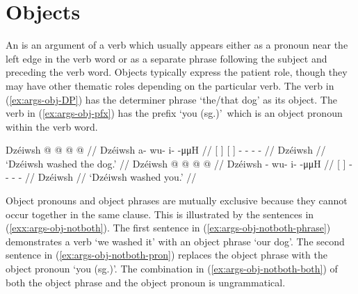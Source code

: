 \section{Objects}\label{sec:args-obj}

An  is an argument of a verb which usually appears either as a pronoun near the left edge in the verb word or as a separate phrase following the subject and preceding the verb word. Objects typically express the patient role, though they may have other thematic roles depending on the particular verb. The verb in (\ref{ex:args-obj-DP}) has the determiner phrase  ‘the/that dog’ as its object. The verb in (\ref{ex:args-obj-pfx}) has the prefix  ‘you (sg.)’\ which is an object pronoun within the verb word.

\pex\label{exx:args-obj}%
\a\label{ex:args-obj-DP}%
%
\begingl
	\gla	{} Dzéiwsh {} {}   {}  @ {} @ {} @ {} @ {} //
	\glb	{} Dzéiwsh {} {}   {} a- wu- i-  -μμH //
	\glc	{}[  {}] {}[   {}]
			- - -  - //
	\gld	{} Dzéiwsh {} {}   {}  {} {} {} {} //
	\glft	‘Dzéiwsh washed the dog.’
		//
\endgl
\a\label{ex:args-obj-pfx}%
%
\begingl
	\gla	{} Dzéiwsh {}  @ {} @ {} @ {} @ {} //
	\glb	{} Dzéiwsh {} - wu- i-  -μμH //
	\glc	{}[  {}] - - -  - //
	\gld	{} Dzéiwsh {}  {} {} {} {} //
	\glft	‘Dzéiwsh washed you.’
		//
\endgl
\xe

Object pronouns and object phrases are mutually exclusive because they cannot occur together in the same clause. This is illustrated by the sentences in (\ref{exx:args-obj-notboth}). The first sentence in (\ref{ex:args-obj-notboth-phrase}) demonstrates a verb  ‘we washed it’ with an object phrase  ‘our dog’. The second sentence in (\ref{ex:args-obj-notboth-pron}) replaces the object phrase with the object pronoun  ‘you (sg.)’. The combination in (\ref{ex:args-obj-notboth-both}) of both the object phrase and the object pronoun is ungrammatical.

